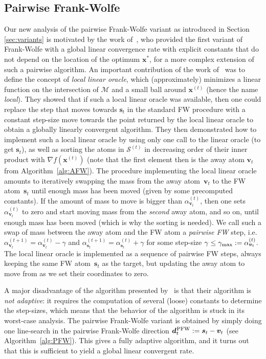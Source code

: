 \documentclass{article} %
\newcommand{\domain}{\mathcal{M}} %
\newcommand{\stepsize}{\gamma}
\newcommand{\stepmax}{\stepsize_{\textnormal{\scriptsize max}}} %
\newcommand{\PFW}{{\hspace{0.05em}\textnormal{PFW}}}
\newcommand{\x}{\bm{x}}
\newcommand{\s}{\bm{s}}
\newcommand{\dd}{\bm{d}}
\newcommand{\vv}{\bm{v}} %
\newcommand{\Coreset}{\mathcal{S}}
\newcommand{\0}{\mathbf{0}} %
\begin{document}
\subsection{Pairwise Frank-Wolfe}\label{sec:PFWdetails}
Our new analysis of the pairwise Frank-Wolfe variant as introduced in Section
\ref{sec:variants} is motivated by the work of~\citet{Garber:2013vl}, who
provided the first variant of Frank-Wolfe with a global linear convergence
rate with explicit constants that do not depend on the location of the
optimum $\x^*$, for a more complex extension of such a pairwise algorithm.
An important contribution of the work of~\citet{Garber:2013vl} was to define
the concept of \emph{local linear oracle}, which (approximately) minimizes a
linear function on the intersection of $\domain$ and a small ball around
$\x^{(t)}$ (hence the name \emph{local}). They showed that if such a local
linear oracle was available, then one could replace the step that moves
towards $\s_t$ in the standard FW procedure with a constant step-size move
towards the point returned by the local linear oracle to obtain a globally
linearly convergent algorithm. They then demonstrated how to implement such a
local linear oracle by using only one call to the linear oracle (to get
$\s_t$), as well as sorting the atoms in $\Coreset^{(t)}$ in decreasing order
of their inner product with $\nabla f(\x^{(t)})$ (note that the first element
then is the away atom $\vv_t$ from Algorithm~\ref{alg:AFW}). The procedure
implementing the local linear oracle amounts to iteratively swapping the mass
from the away atom~$\vv_t$ to the FW atom~$\s_t$ until enough mass has been
moved (given by some precomputed constants). If the amount of mass to move is
bigger than $\alpha_{\vv_t}^{(t)}$, then one sets $\alpha_{\vv_t}^{(t)}$  to zero and
start moving mass from the \emph{second} away atom, and so on, until enough
mass has been moved (which is why the sorting is needed). We call such a swap
of mass between the away atom and the FW atom a \emph{pairwise FW} step, i.e.
$\alpha_{\vv_t}^{(t+1)} = \alpha_{\vv_t}^{(t)} - \stepsize$ and
$\alpha_{\s_t}^{(t+1)} = \alpha_{\s_t}^{(t)} + \stepsize$ for some step-size
$\stepsize \leq \stepmax := \alpha_{\vv_t}^{(t)}$. The local linear oracle is
implemented as a sequence of pairwise FW steps, always keeping the same FW
atom~$\s_t$ as the target, but updating the away atom to move from as we set their
coordinates to zero.

A major disadvantage of the algorithm presented by~\citet{Garber:2013vl} is
that their algorithm is \emph{not adaptive}: it requires the computation of
several (loose) constants to determine the step-sizes, which means that the
behavior of the algorithm is stuck in its worst-case analysis. 
The pairwise Frank-Wolfe variant is obtained by simply doing one line-search
in the pairwise Frank-Wolfe direction $\dd^\PFW_t := \s_t - \vv_t$ (see
Algorithm~\ref{alg:PFW}). This gives a fully adaptive algorithm, and it turns
out that this is sufficient to yield a global linear convergent rate.
\end{document}
